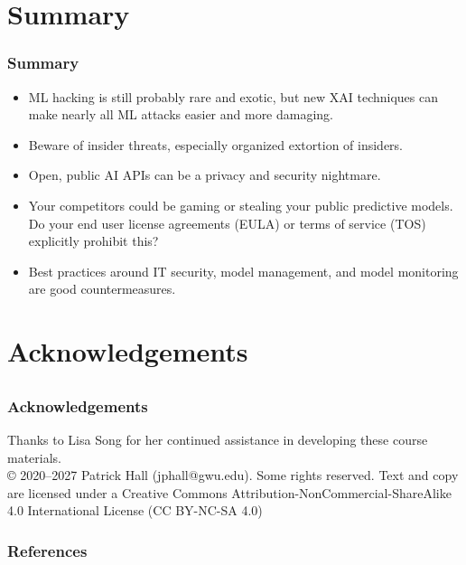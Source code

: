 \documentclass[11pt,
               aspectratio=169,
               hyperref={colorlinks}
               ]{beamer}
\begin{document}
	\section{Summary}

		\begin{frame}
		
			\frametitle{Summary}		
			
			\begin{itemize}
				\item ML hacking is still probably rare and exotic, but new XAI techniques can make nearly all ML attacks easier and more damaging.
				\item Beware of insider threats, especially organized extortion of insiders. 
				\item Open, public AI APIs can be a privacy and security nightmare. 
				\item Your competitors could be gaming or stealing your public predictive models. Do your end user license agreements (EULA) or terms of service (TOS) explicitly prohibit this?
				\item Best practices around IT security, model management, and model monitoring are good countermeasures.
			\end{itemize}
		
		\end{frame}

\section{Acknowledgements}

\subsection*{}

\begin{frame}
	
	\frametitle{Acknowledgements}
			
	Thanks to Lisa Song for her continued assistance in developing these course materials.\\
	\vspace{10pt}
	© 2020–2027 Patrick Hall (jphall@gwu.edu). Some rights reserved. Text and copy are licensed under a Creative Commons Attribution-NonCommercial-ShareAlike 4.0 International License (CC BY-NC-SA 4.0)  
	
\end{frame}	


	\begin{frame}[t, allowframebreaks]
	
		\frametitle{References}		
		
		\printbibliography
		
	\end{frame}
\end{document}
